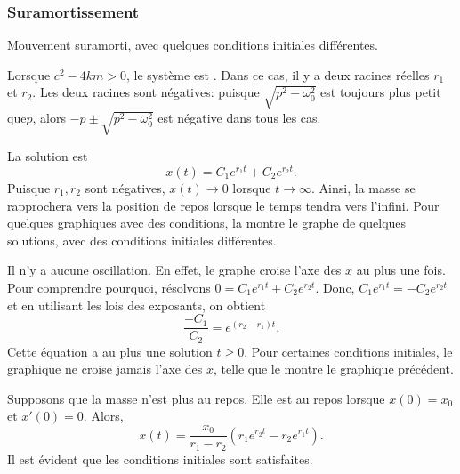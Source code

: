 \subsubsection{Suramortissement}

\begin{mywrapfig}[15]{3.25in}
\capstart
{}
\caption{Mouvement suramorti, avec quelques conditions initiales différentes.\label{mv:overdampedfig}}
\end{mywrapfig}
%
%

Lorsque $c^2 - 4km > 0$, le système est \emph{}.  
Dans ce cas, il y a deux racines réelles $r_1$ et $r_2$.  
Les deux racines sont négatives:   puisque $\sqrt{p^2 - \omega_0^2}$ est toujours plus petit que$p$,
alors $-p \pm \sqrt{p^2 - \omega_0^2}$ est négative dans tous les cas.


La solution est 
\begin{equation*}
	x(t) = C_1 e^{r_1 t} + C_2 e^{r_2 t} .
\end{equation*}
Puisque  $r_1, r_2$ sont négatives, $x(t) \to 0$ lorsque $t \to \infty$.
Ainsi, la masse se rapprochera vers la position de repos lorsque le temps tendra vers l'infini. 
Pour quelques graphiques avec des conditions, la  montre 
le graphe de quelques solutions, avec des conditions initiales différentes.


Il n'y a aucune oscillation. En effet, le graphe croise l'axe des 
$x$ au plus une fois.  Pour comprendre pourquoi, résolvons 
$0 = C_1 e^{r_1 t} + C_2 e^{r_2 t}$.
Donc, $C_1 e^{r_1 t} = - C_2 e^{r_2 t}$ et en utilisant les lois des exposants, on obtient  
\begin{equation*}
	\frac{-C_1}{C_2} = e^{(r_2-r_1) t} .
\end{equation*}
Cette équation a au plus une solution  $t \geq 0$.  
Pour certaines conditions initiales, le graphique ne croise jamais l'axe des $x$, 
telle que le montre le graphique précédent. 

\begin{example}
	Supposons que la masse n'est plus au repos. Elle est au repos lorsque   
	$x(0) = x_0$ et $x'(0) = 0$.
	Alors,
	\begin{equation*}
		x(t) = \frac{x_0}{r_1-r_2} \left(r_1 e^{r_2 t} - r_2 e^{r_1 t} \right) .
	\end{equation*}
	Il est évident que les conditions initiales sont satisfaites.
\end{example}



